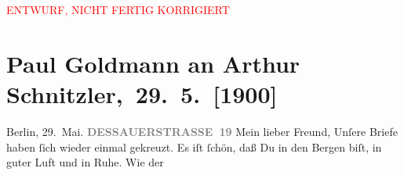 
\begin{center}
            \textcolor{red}{ENTWURF, NICHT FERTIG KORRIGIERT}
                      \end{center}
            
         
         \renewcommand{\erwaehntePersonen}{Personen: Richard Beer-Hofmann, Otto Brahm, Erich Freund, Clementine Goldmann, Paul Schlenther}
         \renewcommand{\erwaehnteInstitutionen}{Institutionen: Burgtheater, Freie literarische Vereinigung zu Breslau}
         \renewcommand{\erwaehnteOrte}{Orte: Alpen, Aussichtsturm Merkur, Berlin, Breslau, Dessauer Straße, Dänemark, Kopenhagen, Puchberg am Schneeberg, Schneeberg}
         \renewcommand{\erwaehnteWerke}{Werke: Der Schleier der Beatrice. Schauspiel in fünf Akten}
               \section[ Paul Goldmann an Arthur Schnitzler, 29. 5. {[}1900{]}]{ Paul Goldmann an Arthur Schnitzler, 29. 5. {[}1900{]}}\nopagebreak{}\rehead{ }\begin{ledgroupsized}[t]{13cm}\normalsize\beginnumbering \toendnotes[C]{\smallbreak\pagebreak[2]} 
\toendnotes[C]{\smallbreak}\pstart
           \raggedleft{}{\pb}Berlin, 29. Mai.\pend
           \pstart
           \textcolor{gray}{\textbf{DESSAUERSTRASSE 19}}\pend
           \pstart\center{}Mein lieber Freund,\pend\pstart
           Unſere Briefe haben ſich wieder einmal gekreuzt. Es iſt ſchön, daß Du in den Bergen biſt, in guter Luft und
               in Ruhe. Wie der \label{K_L02917-2v}
\end{ledgroupsized}
